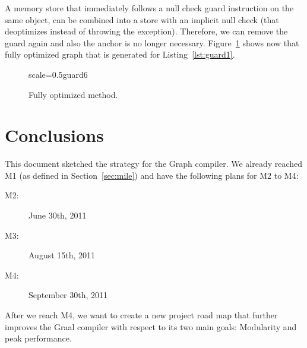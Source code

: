 \documentclass[twocolumn]{svjour3}
\begin{document}
A memory store that immediately follows a null check guard instruction on the same object, can be combined into a store with an implicit null check (that deoptimizes instead of throwing the exception).
Therefore, we can remove the guard again and also the anchor is no longer necessary.
Figure~\ref{fig:guard6} shows now that fully optimized graph that is generated for Listing~\ref{lst:guard1}.

\begin{figure}[h]
  \centering
\begin{digraphenv}{scale=0.5}{guard6}
\end{digraphenv}
  \caption{Fully optimized method.}
  \label{fig:guard6}
\end{figure}


\section{Conclusions}
\label{sec:conclusions}
This document sketched the strategy for the Graph compiler.
We already reached M1 (as defined in Section~\ref{sec:mile}) and have the following plans for M2 to M4:
\begin{description}
\item[M2:] June 30th, 2011
\item[M3:] August 15th, 2011
\item[M4:] September 30th, 2011
\end{description}
After we reach M4, we want to create a new project road map that further improves the Graal compiler with respect to its two main goals: Modularity and peak performance.
\end{document}
